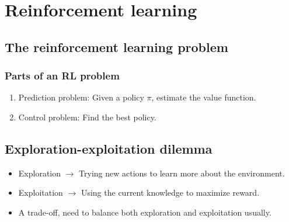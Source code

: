 \section{Reinforcement learning}

\subsection{The reinforcement learning problem}

\subsubsection{Parts of an RL problem}

\begin{enumerate}
      \item
            Prediction problem:
            Given a policy \( \pi \), estimate the value function.
      \item
            Control problem:
            Find the best policy.
\end{enumerate}

\subsection{Exploration-exploitation dilemma}

\begin{itemize}
      \item
            Exploration \( \to \) Trying new actions to learn more about the environment.
      \item
            Exploitation \( \to \) Using the current knowledge to maximize reward.
      \item
            A trade-off, need to balance both exploration and exploitation usually.
\end{itemize}
